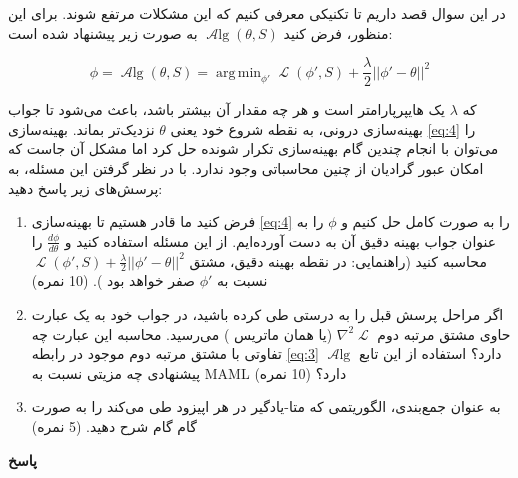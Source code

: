 \documentclass{article}
\DeclareMathOperator*{\argmin}{arg\,min}
\DeclareMathOperator{\Loss}{\mathcal{L}}
\DeclareMathOperator{\Alg}{\mathcal{A}lg}
\begin{document}
در این سوال قصد داریم تا تکنیکی معرفی کنیم که این مشکلات مرتفع شوند. برای این منظور، فرض کنید 
$\Alg(\theta, S)$
به صورت زیر پیشنهاد شده است:

\begin{equation}		\label{eq:4}
	\phi = \Alg(\theta,S) = \argmin_{\phi'} \Loss(\phi', S) + \frac{\lambda}{2}||\phi' - \theta||^2
\end{equation}
 
که $\lambda$ یک هایپرپارامتر است و هر چه مقدار آن بیشتر باشد، باعث می‌شود تا جواب بهینه‌سازی درونی، به نقطه شروع خود یعنی
$\theta$
نزدیک‌تر بماند. بهینه‌سازی \ref{eq:4}
را می‌توان با انجام چندین گام بهینه‌سازی تکرار شونده
  حل کرد اما مشکل آن جاست که امکان عبور گرادیان از چنین محاسباتی وجود ندارد. با در نظر گرفتن این مسئله، به پرسش‌های زیر پاسخ دهید:

\begin{enumerate}
\item
فرض کنید ما قادر هستیم تا بهینه‌سازی 
\ref{eq:4}
را به صورت کامل حل کنیم و 
$\phi$
را به عنوان جواب بهینه دقیق آن به دست آورده‌ایم. از این مسئله استفاده کنید و 
$\frac{d\phi}{d\theta}$
را محاسبه کنید (راهنمایی: در نقطه بهینه دقیق، مشتق 
$ \Loss(\phi', S) + \frac{\lambda}{2}||\phi' - \theta||^2$
نسبت به 
$\phi'$
صفر خواهد بود
).
(10 نمره)

\item
اگر مراحل پرسش قبل را به درستی طی کرده باشید، در جواب خود به یک عبارت حاوی مشتق مرتبه دوم $\nabla^2 \Loss$ (یا همان ماتریس 
)
می‌رسید. محاسبه این عبارت چه تفاوتی با مشتق مرتبه دوم موجود در رابطه 
\ref{eq:3}
دارد؟ استفاده از این تابع
$\Alg$
پیشنهادی چه مزیتی نسبت به MAML دارد؟
(10 نمره)

\item
به عنوان جمع‌بندی، الگوریتمی که متا-یادگیر در هر اپیزود طی می‌کند را به صورت گام گام شرح دهید.
(5 نمره)

\end{enumerate}

\textbf{پاسخ}
\end{document}
